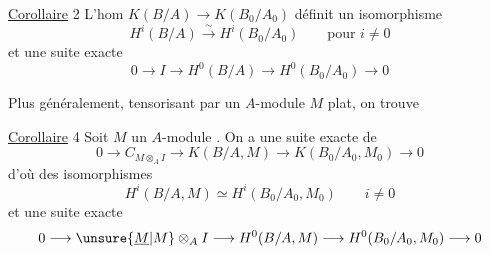 \uline{Corollaire} 2 \quad L'hom $K(B/A)\longrightarrow K(B_0/A_0)$ définit un isomorphisme
\[
H^i(B/A)\xrightarrow{\sim}H^i(B_0/A_0)\qquad\text{pour }i\ne0
\]
et une suite exacte
\[
0\longrightarrow I\longrightarrow H^0(B/A)\longrightarrow H^0(B_0/A_0)\longrightarrow0
\]


Plus généralement, tensorisant par un $A$-module $M$ plat, on trouve

\uline{Corollaire} 4  \quad Soit $M$ un $A$-module . On a une suite exacte de  
\[
0\longrightarrow C_{M\otimes_A I}\longrightarrow K(B/A,M)\longrightarrow K(B_0/A_0,M_0)\longrightarrow0
\]
d'où des isomorphismes
\[
H^i(B/A,M)\simeq H^i(B_0/A_0,M_0)\qquad i\ne0
\]
et une suite exacte
\[
0\longrightarrow \unsure{\underline M|M}\otimes_A I\longrightarrow H^0(B/A,M)\longrightarrow H^0(B_0/A_0,M_0)\longrightarrow0
\]

